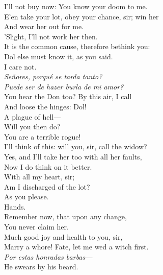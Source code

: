 \documentclass[a4paper,oneside,12pt]{memoir}
\begin{document}
\begin{drama*}
I'll not buy now: You know your doom to me.\\
E'en take your lot, obey your chance, sir; win her\\
And wear her out for me.\\
\subtlespeaks {} 'Slight, I'll not work her then.\\
\facespeaks It is the common cause, therefore bethink you:\\
Dol else must know it, as you said.\\
\subtlespeaks {} I care not.\\
\surlyspeaks \emph{Se\~{n}ores, porqu\'{e} se tarda tanto?\\
Puede ser de hazer burla de mi amor?}\\
\facespeaks You hear the Don too? By this air, I call\\
And loose the hinges: Dol!\\
\subtlespeaks {} A plague of hell---\\
\facespeaks Will you then do?\\
\subtlespeaks {} You are a terrible rogue!\\
I'll think of this: will you, sir, call the widow?\\
\facespeaks Yes, and I'll take her too with all her faults,\\
Now I do think on it better.\\
\subtlespeaks {} With all my heart, sir;\\
Am I discharged of the lot?\\
\facespeaks {} As you please.\\
\subtlespeaks {} Hands.\\
\facespeaks Remember now, that upon any change,\\
You never claim her.\\
\subtlespeaks {} Much good joy and health to you, sir,\\
Marry a whore! Fate, let me wed a witch first.\\
\surlyspeaks \emph{Por estas honradas barbas---}\\
\subtlespeaks {} He swears by his beard.\\

\end{drama*}
\end{document}
